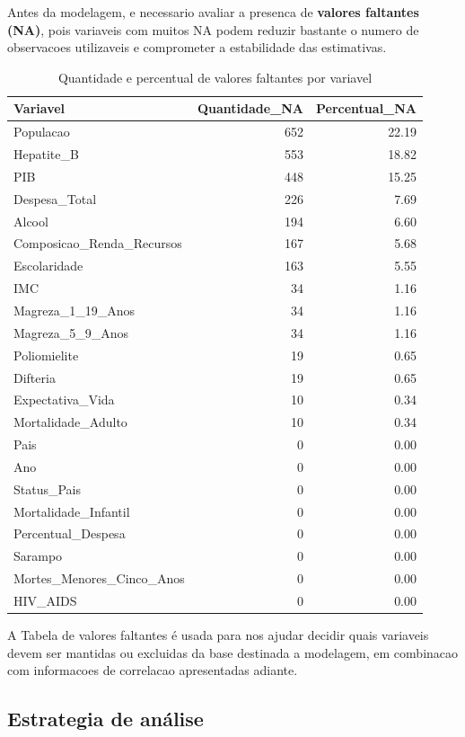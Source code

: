 \documentclass[
  12pt,
]{article}
\begin{document}
Antes da modelagem, e necessario avaliar a presenca de \textbf{valores
faltantes (NA)}, pois variaveis com muitos NA podem reduzir bastante o
numero de observacoes utilizaveis e comprometer a estabilidade das
estimativas.

\begin{longtable}[t]{lrr}
\caption{\label{tab:unnamed-chunk-4}Quantidade e percentual de valores faltantes por variavel}\\
\toprule
Variavel & Quantidade\_NA & Percentual\_NA\\
\midrule
Populacao & 652 & 22.19\\
Hepatite\_B & 553 & 18.82\\
PIB & 448 & 15.25\\
Despesa\_Total & 226 & 7.69\\
Alcool & 194 & 6.60\\
\addlinespace
Composicao\_Renda\_Recursos & 167 & 5.68\\
Escolaridade & 163 & 5.55\\
IMC & 34 & 1.16\\
Magreza\_1\_19\_Anos & 34 & 1.16\\
Magreza\_5\_9\_Anos & 34 & 1.16\\
\addlinespace
Poliomielite & 19 & 0.65\\
Difteria & 19 & 0.65\\
Expectativa\_Vida & 10 & 0.34\\
Mortalidade\_Adulto & 10 & 0.34\\
Pais & 0 & 0.00\\
\addlinespace
Ano & 0 & 0.00\\
Status\_Pais & 0 & 0.00\\
Mortalidade\_Infantil & 0 & 0.00\\
Percentual\_Despesa & 0 & 0.00\\
Sarampo & 0 & 0.00\\
\addlinespace
Mortes\_Menores\_Cinco\_Anos & 0 & 0.00\\
HIV\_AIDS & 0 & 0.00\\
\bottomrule
\end{longtable}

A Tabela de valores faltantes é usada para nos ajudar decidir quais
variaveis devem ser mantidas ou excluidas da base destinada a modelagem,
em combinacao com informacoes de correlacao apresentadas adiante.

\subsection{Estrategia de análise}\label{estrategia-de-anuxe1lise}
\end{document}
